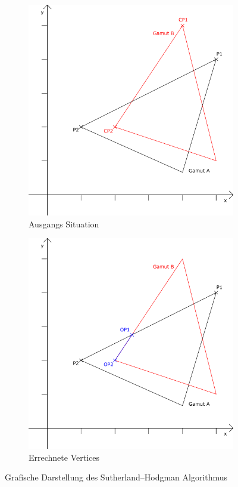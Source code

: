 \documentclass[11pt]{scrartcl}
\begin{document}
\begin{figure}[H]
    \centering
    \begin{subfigure}[b]{.49\textwidth}
        \includegraphics[width=\textwidth]{images/sutherland_hodgman_example.png}
        \caption{Ausgangs Situation}
    \end{subfigure}
    \hfill 
    \begin{subfigure}[b]{.49\textwidth}
        \includegraphics[width=\textwidth]{images/sutherland_hodgman_example_solution.png}
        \caption{Errechnete Vertices}
    \end{subfigure}
    \caption{Grafische Darstellung des Sutherland–Hodgman Algorithmus} \label{fig:sutherland_hodgman}
\end{figure}
\end{document}
